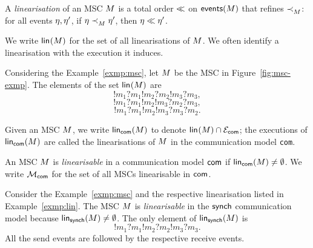 \bigskip

\begin{definition}[Linearisation]\label{def:linearisation}
	A \emph{linearisation} of an MSC $M$ is a
	total order $\mathrel{\ll}$ on $\mathsf{events}(M)$
	that refines $\mathrel{\prec_{M}^{}}$:  for all events $\eta,\eta'$, 
	if $\eta\mathrel{\prec_{M}^{}} \eta'$, then $\eta\mathrel{\ll} \eta'$. 
\end{definition}
We write $\mathsf{lin}_{}(M)$ for the set of all linearisations
of $M$. 
We often identify a linearisation with the execution it induces.

\bigskip

\begin{example}\label{exmp:lin}
Considering the Example~\ref{exmp:msc},	
let $M$ be the MSC in Figure~\ref{fig:msc-exmp}. 
The elements of the set $\mathsf{lin}_{}(M)$ are
$$!m_1?m_1!m_2?m_2!m_3?m_3,$$
$$!m_1?m_1!m_2!m_3?m_2?m_3,$$
$$!m_1?m_1!m_2!m_3?m_3?m_2.$$
\end{example}

Given an MSC $M$, we write 
$\mathsf{lin}_{\mathsf{com}}(M)$ to denote
$\mathsf{lin}_{}(M)\cap\mathcal{E}_{\mathsf{com}}$;
the executions of $\mathsf{lin}_{\mathsf{com}}(M)$ 
are called the linearisations of $M$ in the communication 
model \verb|com|.

\bigskip

\begin{definition}
	\label{def:linearisable-msc}
	An MSC $M$ is \textit{linearisable} in a communication 
	model $\mathsf{com}$
	if $\mathsf{lin}_{\mathsf{com}}(M)\neq\emptyset$.
	We write $\mathcal{M}_{\mathsf{com}}$ for the set of all MSCs 
	linearisable in $\mathsf{com}$.
\end{definition}

\bigskip

\begin{example}
Consider the Example~\ref{exmp:msc} and the respective linearisation
listed in Example~\ref{exmp:lin}. 
The MSC $M$ is \textit{linearisable} in the $\mathsf{synch}$ communication 
model because
$\mathsf{lin}_{\mathsf{synch}}(M)\neq\emptyset$.
The only element of $\mathsf{lin}_{\mathsf{synch}}(M)$ is
$$!m_1?m_1!m_2?m_2!m_3?m_3.$$
All the send events are followed by the respective
receive events.
\end{example}

